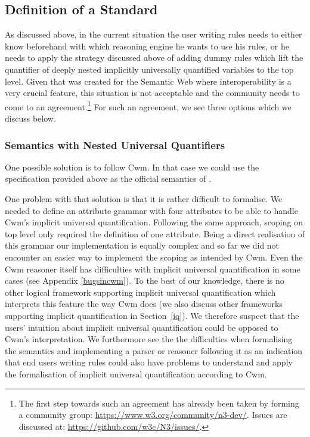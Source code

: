 \subsection{Definition of a Standard}
As discussed above, in the current situation the user writing rules needs to either know beforehand with which reasoning engine he wants to use his rules, or he needs to apply the strategy discussed 
above of adding dummy rules which lift the quantifier of deeply nested implicitly universally quantified variables to the top level. 
Given that \nthreelogic was created for the Semantic Web where interoperability is a very crucial feature, this situation is not acceptable and  
the community needs to come to an agreement.\footnote{The first step towards such an agreement has already been taken by forming a \wwwc community group:
\url{https://www.w3.org/community/n3-dev/}. Issues are discussed at: \url{https://github.com/w3c/N3/issues/}.
} For such an agreement, we see three options which we discuss below.
\subsubsection{Semantics with Nested Universal Quantifiers}
One possible solution is to follow Cwm.
In that case we could use the specification 
provided above as the official semantics of \nthree.

One problem with that solution is that it is rather difficult to formalise. 
We needed to define an attribute grammar with four attributes to be able to handle Cwm's implicit universal 
quantification. Following the same approach, scoping on top level only required the definition of one attribute. 
Being a direct realisation of this grammar our implementation is equally complex and so far we did not  encounter an easier way 
to implement the scoping as intended by Cwm.
Even the Cwm reasoner itself has difficulties with implicit universal quantification in some cases (see Appendix \ref{bugsincwm}).
To the best of our knowledge, there is no other logical framework supporting implicit universal quantification
which interprets this feature the way Cwm does (we also discuss other frameworks supporting implicit quantification in Section~\ref{iq}).
We therefore suspect that the users' intuition about implicit universal quantification could be opposed to Cwm's interpretation. %
We furthermore see the
the difficulties when formalising the semantics and implementing a parser or reasoner following it as an indication that end users writing \nthree rules 
could also have problems to 
understand and apply the formalisation of implicit universal quantification according to Cwm. %

